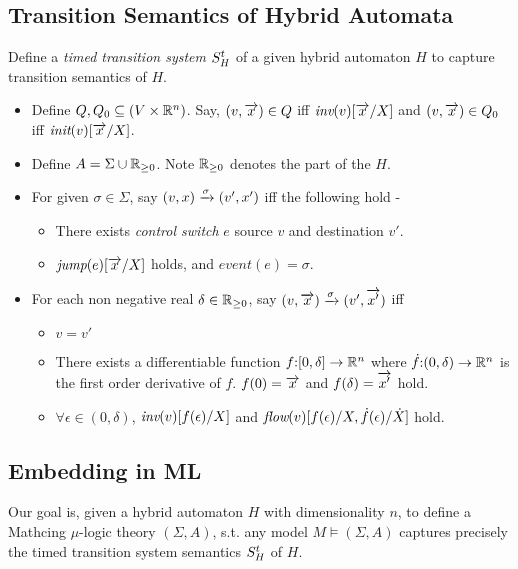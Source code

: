\documentclass[]{article}
\begin{document}
\subsection{Transition Semantics of Hybrid Automata}
Define a \textit{timed transition system} $S^t_H$ of a given hybrid automaton
$H$ to capture transition semantics of $H$.
\begin{itemize}
  \item Define $Q, Q_0 \subseteq (V \times \mathbb{R}^{n})$. Say, $(v, \overrightarrow{x}) \in Q$ iff
    $\textit{inv}(v)[\overrightarrow{x} / X]$ and $(v, \overrightarrow{x}) \in Q_0$ iff $\textit{init}(v)[\overrightarrow{x} /
    X]$.
  \item Define $A = \Sigma \cup \mathbb{R}_{\geq 0} $. Note $\mathbb{R}_{\geq 0}$ denotes the 
    part of the $H$.
  \item For given $\sigma \in \Sigma$, say $(v,x) \xrightarrow{\sigma} (v', x')$ iff
    the following hold -
    \begin{itemize}
      \item There exists \textit{control switch} $e$ source $v$ and destination
        $v'$.
      \item $\textit{jump}(e)[\overrightarrow{x} / X]$ holds, and $\textit{event}(e) = \sigma$.
    \end{itemize}
  \item For each non negative real $\delta \in \mathbb{R}_{\geq 0}$, say $(v,\overrightarrow{x})
    \xrightarrow{\sigma} (v', \overrightarrow{x'})$ iff
    \begin{itemize}
      \item $ v = v' $
      \item There exists a differentiable function $f \mathord{:} [0, \delta] \to \mathbb{R}^{n}$
        where $\dot{f} \mathord{:} (0, \delta) \to \mathbb{R}^{n}$ is the first order
        derivative of $f$. $f(0) = \overrightarrow{x}$ and $f(\delta) = \overrightarrow{x'}$
        hold.
      \item $\forall \epsilon \in (0, \delta)$, $\textit{inv}(v)[f(\epsilon) / X]$
        and $\textit{flow}(v)[f(\epsilon) / X, \dot{f}(\epsilon) /  \dot{X}]$ hold.
    \end{itemize}
\end{itemize}



\subsection{Embedding in ML}
Our goal is, given a hybrid automaton $H$ with dimensionality $n$, to define a Mathcing $\mu$-logic
theory $(\Sigma, A)$, s.t. any model $M \vDash (\Sigma, A)$ captures precisely
the timed transition system semantics $S^t_H$ of $H$.
\end{document}
